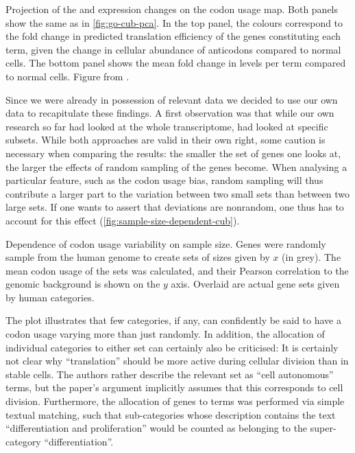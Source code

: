     {Projection of the \trna and \mrna expression changes on the codon usage
    map.}
    {Both panels show the same \pca as in \cref{fig:go-cub-pca}. In the top
    panel, the colours correspond to the fold change in predicted translation
    efficiency of the genes constituting each \go term, given the change in
    cellular abundance of \trna anticodons compared to normal cells. The bottom
    panel shows the mean fold change in \mrna levels per \go term compared to
    normal cells. Figure from \citet{Gingold:2014}.}

Since we were already in possession of relevant \trna data we decided to use our
own data to recapitulate these findings. A first observation was that while our
own research so far had looked at the whole transcriptome, \citet{Gingold:2014}
had looked at specific subsets. While both approaches are valid in their own
right, some caution is necessary when comparing the results: the smaller the set
of genes one looks at, the larger the effects of random sampling of the genes
become. When analysing a particular feature, such as the codon usage bias,
random sampling will thus contribute a larger part to the variation between two
small sets than between two large sets. If one wants to assert that deviations
are nonrandom, one thus has to account for this effect
(\cref{fig:sample-size-dependent-cub}).

    {Dependence of codon usage variability on sample size.}
    {Genes were randomly sample from the human genome to create sets of sizes
    given by \(x\) (in grey). The mean codon usage of the sets was calculated,
    and their Pearson correlation to the genomic background is shown on the
    \(y\) axis. Overlaid are actual gene sets given by human \go categories.}

The plot illustrates that few \go categories, if any, can confidently be said to
have a codon usage varying more than just randomly. In addition, the allocation
of individual \go categories to either set can certainly also be criticised: It
is certainly not clear why “translation” should be more active during cellular
division than in stable cells. The authors rather describe the relevant set as
“cell autonomous” \go terms, but the paper’s argument implicitly assumes that
this corresponds to cell division. Furthermore, the allocation of genes to \go
terms was performed via simple textual matching, such that \go sub-categories
whose description contains the text “differentiation and proliferation” would be
counted as belonging to the \go super-category “differentiation”.


